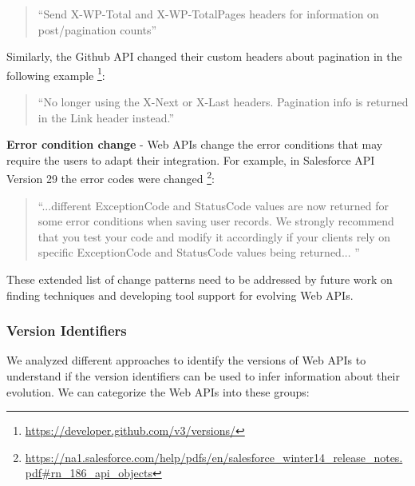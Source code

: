 \documentclass[conference]{IEEEtran}
\begin{document}
\small
\begin{quotation}
``Send X-WP-Total and X-WP-TotalPages headers for information on post/pagination counts''
\end{quotation}
\normalsize

Similarly, the Github API changed their custom headers about pagination in the following example \footnote{\url{https://developer.github.com/v3/versions/}}:

\small
\begin{quotation}
``No longer using the X-Next or X-Last headers. Pagination info is returned in the Link header instead.''
\end{quotation}
\normalsize

\textbf{Error condition change} - Web APIs change the error conditions that may require the users to adapt their integration. For example, in Salesforce API Version 29 the error codes were changed \footnote{\url{https://na1.salesforce.com/help/pdfs/en/salesforce_winter14_release_notes.pdf#rn_186_api_objects}}:

\small
\begin{quotation}
``...different ExceptionCode and StatusCode values are now returned for some error conditions
when saving user records. We strongly recommend that you test your code and modify it accordingly if your clients rely on specific ExceptionCode and StatusCode values being returned...
''\end{quotation}
\normalsize

These extended list of change patterns need to be addressed by future work on finding techniques and developing tool support for evolving Web APIs.


\subsubsection{Version Identifiers}

We analyzed different approaches to identify the versions of Web APIs to understand if the version identifiers can be used to infer information about their evolution. We can categorize the Web APIs into these groups:
\end{document}
